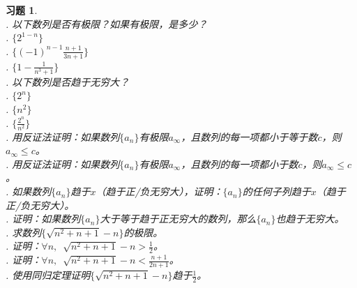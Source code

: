 \documentclass[12pt,UTF8]{ctexbook}
\newtheorem{xt}{习题}[section]
\begin{document}
\begin{xt}
    \mbox{} \\
    . 以下数列是否有极限？如果有极限，是多少？\\
    \indent{}. $\{2^{1-n}\}$ \\
    \indent{}. $\{(-1)^{n-1}\frac{n+1}{3n+1}\}$ \\
    \indent{}. $\{1 - \frac{1}{n^3+1}\}$ \\
    . 以下数列是否趋于无穷大？\\
    \indent{}. $\{2^{n}\}$ \\
    \indent{}. $\{n^2\}$ \\
    \indent{}. $\{\frac{2^n}{n^2}\}$\\
    . 用反证法证明：如果数列$\{a_n\}$有极限$a_\infty$，且数列的每一项都小于等于数$c$，则$a_\infty \leqslant c$。\\
    . 用反证法证明：如果数列$\{a_n\}$有极限$a_\infty$，且数列的每一项都小于数$c$，则$a_\infty \leqslant c$。\\
    . 如果数列$\{a_n\}$趋于$x$（趋于正/负无穷大），证明：$\{a_n\}$的任何子列趋于$x$（趋于正/负无穷大）。\\
    . 证明：如果数列$\{a_n\}$大于等于趋于正无穷大的数列，那么$\{a_n\}$也趋于无穷大。\\
    . 求数列$\{\sqrt{n^2 + n + 1} - n\}$的极限。\\
    . 证明：$\forall n,\,\,\, \sqrt{n^2 + n + 1} - n > \frac{1}{2}$。\\
    . 证明：$\forall n,\,\,\, \sqrt{n^2 + n + 1} - n < \frac{n + 1}{2n + 1}$。\\
    . 使用同归定理证明$\{\sqrt{n^2 + n + 1} - n\}$趋于$\frac{1}{2}$。
\end{xt}
\end{document}
